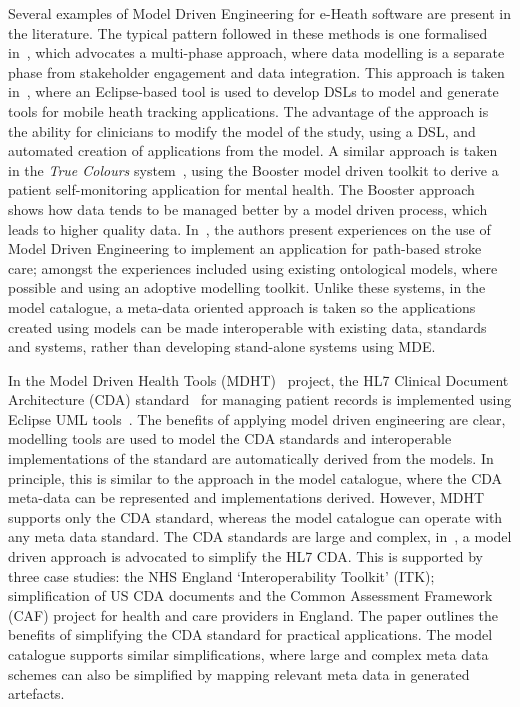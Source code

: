 Several examples of Model Driven Engineering for e-Heath software are present in the literature. The typical pattern followed in these methods is one formalised in~\cite{pay12}, which advocates a multi-phase approach, where data modelling is a separate phase from stakeholder engagement and data integration. This approach is taken in~\cite{kham08}, where an Eclipse-based tool is used to develop DSLs to model and generate tools for mobile heath tracking applications. The advantage of the approach is the ability for clinicians to modify the model of the study, using a DSL, and automated creation of applications from the model. A similar approach is taken in the \emph{True Colours} system~\cite{dav14}, using the Booster model driven toolkit to derive a patient self-monitoring application for mental health. The Booster approach shows how data tends to be managed better by a model driven process, which leads to higher quality data. In~\cite{schl15}, the authors present experiences on the use of Model Driven Engineering to implement an application for path-based stroke care; amongst the experiences included using existing ontological models, where possible and using an adoptive modelling toolkit. Unlike these systems, in the model catalogue, a meta-data oriented approach is taken so the applications created using models can be made interoperable with existing data, standards and systems, rather than developing stand-alone systems using MDE. 



In the Model Driven Health Tools (MDHT)~\cite{MDHT} project, the HL7 Clinical Document Architecture (CDA) standard~\cite{doli06} for managing patient records is implemented using Eclipse UML tools~\cite{eUML}. The benefits of applying model driven engineering are clear, modelling tools are used to model the CDA standards and interoperable implementations of the standard are automatically derived from the models. In principle, this is similar to the approach in the model catalogue, where the CDA meta-data can be represented and implementations derived. However, MDHT supports only the CDA standard, whereas the model catalogue can operate with any meta data standard. The CDA standards are large and complex, in~\cite{sco12}, a model driven approach is advocated to simplify the HL7 CDA. This is supported by three case studies: the NHS England ‘Interoperability Toolkit’ (ITK); simplification of US CDA documents and the Common Assessment Framework (CAF) project for health and care providers in England. The paper outlines the benefits of simplifying the CDA standard for practical applications. The model catalogue supports similar simplifications, where large and complex meta data schemes can also be simplified by mapping relevant meta data in generated artefacts.





